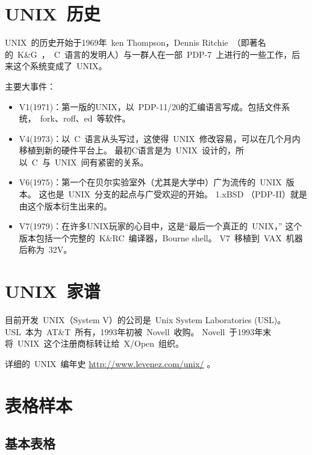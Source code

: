 \documentclass[../Main/thesis.tex]{subfiles}
\begin{document}
\section{UNIX~历史}
\label{sec:history}
UNIX~的历史开始于1969年~ken Thompson，Dennis Ritchie~（即著名的~K\&G~，~C~语言的发明人）与一群人在一部~PDP-7~上进行的一些工作，后来这个系统变成了~UNIX。

主要大事件：
\begin{itemize}
  \item V1(1971)：第一版的UNIX，以~PDP-11/20的汇编语言写成。包括文件系统，~fork、roff、ed~等软件。
  \item V4(1973)：以~C~语言从头写过，这使得~UNIX~修改容易，可以在几个月内移植到新的硬件平台上。
        最初C语言是为~UNIX~设计的，所以~C~与~UNIX~间有紧密的关系。
  \item V6(1975)：第一个在贝尔实验室外（尤其是大学中）广为流传的~UNIX~版本。
        这也是~UNIX~分支的起点与广受欢迎的开始。
        1.xBSD （PDP-II）就是由这个版本衍生出来的。
  \item V7(1979)：在许多UNIX玩家的心目中，这是“最后一个真正的~UNIX，”
        这个版本包括一个完整的~K\&RC~编译器，Bourne shell。
        V7~移植到~VAX~机器后称为~32V。
\end{itemize}

\section{UNIX~家谱}
目前开发~UNIX（System V）的公司是~Unix System Laboratories (USL)。
USL~本为~AT\&T~所有，1993年初被~Novell~收购。
Novell~于1993年末将~UNIX~这个注册商标转让给~X/Open~组织。

\label{sec:family}

详细的~UNIX~编年史 \url{http://www.levenez.com/unix/} 。

\section{表格样本}
\label{chap1:sample:table}

\subsection{基本表格}
\label{sec:basictable}
\end{document}
